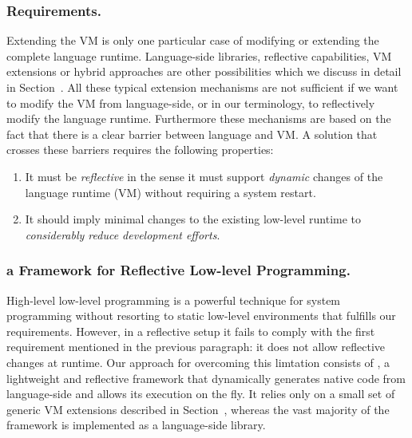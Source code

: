 \subsubsection{Requirements.}
Extending the VM is only one particular case of modifying or extending the complete language runtime.
Language-side libraries, reflective capabilities, VM extensions or hybrid approaches are other possibilities which we discuss in detail in Section~.
All these typical extension mechanisms are not sufficient if we want to modify the VM from language-side, or in our terminology, to reflectively modify the language runtime. Furthermore these mechanisms are based on the fact that there is a clear barrier between language and VM.
A solution that crosses these barriers requires the following properties:


\begin{enumerate}
	\item It must be \emph{reflective} in the sense it must support \emph{dynamic} changes of the language runtime (VM) without requiring a system restart.
	\item It should imply minimal changes to the existing low-level runtime to \emph{considerably reduce development efforts}.
\end{enumerate}


\subsubsection{\B a Framework for Reflective Low-level Programming.}

High-level low-level programming is a powerful technique for system programming without resorting to static low-level environments \cite{Fram09a,Wimm13a} that  fulfills our requirements.
However, in a reflective setup it fails to comply with the first requirement mentioned in the previous paragraph: it does not allow reflective changes at runtime.
Our approach for overcoming this limtation consists of \B, a lightweight and reflective framework that dynamically generates native code from language-side and allows its execution on the fly.
It relies only on a small set of generic VM extensions described in Section~, whereas the vast majority of the framework is implemented as a language-side library.

